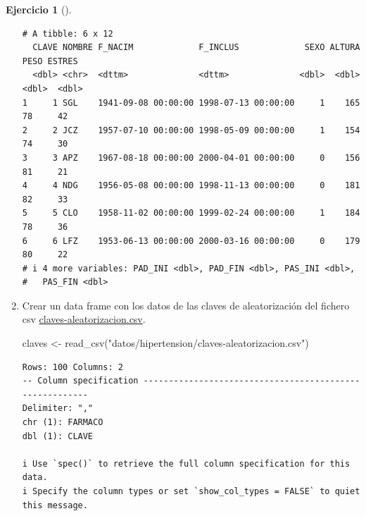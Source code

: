 \documentclass[
  a4paper,
]{scrreport}
\newenvironment{Shaded}{\begin{snugshade}}{\end{snugshade}}
\newcommand{\FunctionTok}[1]{\textcolor[rgb]{0.28,0.35,0.67}{#1}}
\newcommand{\NormalTok}[1]{\textcolor[rgb]{0.00,0.23,0.31}{#1}}
\newcommand{\OtherTok}[1]{\textcolor[rgb]{0.00,0.23,0.31}{#1}}
\newcommand{\StringTok}[1]{\textcolor[rgb]{0.13,0.47,0.30}{#1}}
\theoremstyle{definition}
\newtheorem{exercise}{Ejercicio}[chapter]
\theoremstyle{remark}
\begin{document}
\begin{exercise}[]
\begin{enumerate}
\begin{tcolorbox}
\begin{verbatim}
# A tibble: 6 x 12
  CLAVE NOMBRE F_NACIM             F_INCLUS             SEXO ALTURA  PESO ESTRES
  <dbl> <chr>  <dttm>              <dttm>              <dbl>  <dbl> <dbl>  <dbl>
1     1 SGL    1941-09-08 00:00:00 1998-07-13 00:00:00     1    165    78     42
2     2 JCZ    1957-07-10 00:00:00 1998-05-09 00:00:00     1    154    74     30
3     3 APZ    1967-08-18 00:00:00 2000-04-01 00:00:00     0    156    81     21
4     4 NDG    1956-05-08 00:00:00 1998-11-13 00:00:00     0    181    82     33
5     5 CLO    1958-11-02 00:00:00 1999-02-24 00:00:00     1    184    78     36
6     6 LFZ    1953-06-13 00:00:00 2000-03-16 00:00:00     0    179    80     22
# i 4 more variables: PAD_INI <dbl>, PAD_FIN <dbl>, PAS_INI <dbl>,
#   PAS_FIN <dbl>
\end{verbatim}

  \end{tcolorbox}
\item
  Crear un data frame con los datos de las claves de aleatorización del
  fichero csv
  \href{datos/hipertension/claves-aleatorizacion.csv}{claves-aleatorizacion.csv}.

  \begin{tcolorbox}[enhanced jigsaw, breakable, toptitle=1mm, colbacktitle=quarto-callout-tip-color!10!white, rightrule=.15mm, opacityback=0, opacitybacktitle=0.6, titlerule=0mm, coltitle=black, colframe=quarto-callout-tip-color-frame, colback=white, bottomtitle=1mm, leftrule=.75mm, toprule=.15mm, title=\textcolor{quarto-callout-tip-color}{\faLightbulb}\hspace{0.5em}{Solución}, arc=.35mm, bottomrule=.15mm, left=2mm]

\begin{Shaded}
\begin{Highlighting}[]
\NormalTok{claves }\OtherTok{\textless{}{-}} \FunctionTok{read\_csv}\NormalTok{(}\StringTok{"datos/hipertension/claves{-}aleatorizacion.csv"}\NormalTok{)}
\end{Highlighting}
\end{Shaded}

\begin{verbatim}
Rows: 100 Columns: 2
-- Column specification --------------------------------------------------------
Delimiter: ","
chr (1): FARMACO
dbl (1): CLAVE

i Use `spec()` to retrieve the full column specification for this data.
i Specify the column types or set `show_col_types = FALSE` to quiet this message.
\end{verbatim}


\end{tcolorbox}
\end{enumerate}
\end{exercise}
\end{document}
